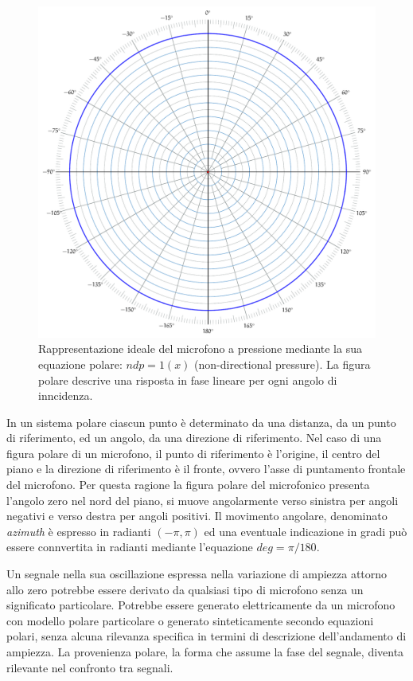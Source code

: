 \begin{figure}[t]
\centering
\includegraphics[width=1\columnwidth]{CAPITOLI/_TIKZ/POLAR/omni}
\caption{Rappresentazione ideale del microfono a pressione mediante la sua
equazione polare: $ndp = 1(x)$ (non-directional pressure). La figura polare
descrive una risposta in fase lineare per ogni angolo di inncidenza.}
\label{polar:omni}
\end{figure}

In un sistema polare ciascun punto è
determinato da una distanza, da un punto di riferimento, ed un angolo, da una
direzione di riferimento. Nel caso di una figura polare di un microfono, il
punto di riferimento è l'origine, il centro del piano e la direzione di
riferimento è il fronte, ovvero l'asse di puntamento frontale del microfono. Per
questa ragione la figura polare del microfonico presenta l'angolo zero
nel nord del piano, si muove angolarmente verso sinistra per angoli
negativi e verso destra per angoli positivi. Il movimento angolare, denominato
\emph{azimuth} è espresso in radianti $(-\pi,\pi)$ ed una eventuale indicazione in
gradi può essere connvertita in radianti mediante l'equazione $deg = \pi/180$.

Un segnale nella sua oscillazione espressa nella variazione di ampiezza
attorno allo zero potrebbe essere derivato da qualsiasi tipo di microfono senza
un significato particolare. Potrebbe essere generato elettricamente da un
microfono con modello polare particolare o generato sinteticamente secondo equazioni polari, senza
alcuna rilevanza specifica in termini di descrizione dell'andamento di ampiezza.
La provenienza polare, la forma che assume la fase del segnale, diventa rilevante nel confronto tra segnali.

